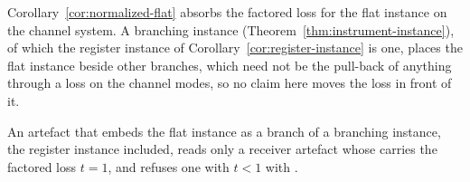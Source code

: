 
Corollary~\ref{cor:normalized-flat} absorbs the factored loss for the flat
instance on the channel system. A branching instance
(Theorem~\ref{thm:instrument-instance}), of which the register instance of
Corollary~\ref{cor:register-instance} is one, places the flat instance beside
other branches, which need not be the pull-back of anything through a loss on
the channel modes, so no claim here moves the loss in front of it.

\begin{requirement}\label{req:normalized-branch-refusal}
An artefact that embeds the flat instance as a branch of a branching
instance, the register instance included, reads only a receiver artefact whose  carries the
factored loss $t=1$, and refuses one with $t<1$ with
.
\end{requirement}
